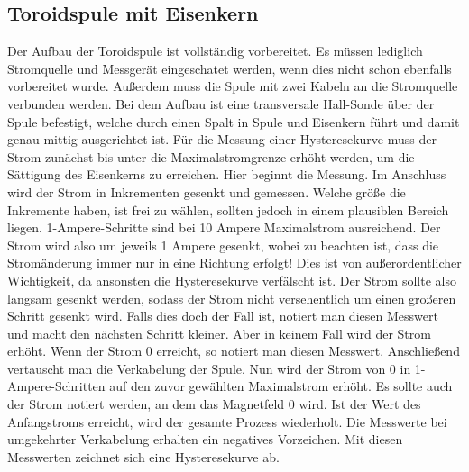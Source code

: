 \subsection{Toroidspule mit Eisenkern}
Der Aufbau der Toroidspule ist vollständig vorbereitet. Es müssen lediglich Stromquelle und Messgerät eingeschatet werden, wenn dies nicht schon ebenfalls vorbereitet wurde.
Außerdem muss die Spule mit zwei Kabeln an die Stromquelle verbunden werden.
Bei dem Aufbau ist eine transversale Hall-Sonde über der Spule befestigt, welche durch einen Spalt in Spule und Eisenkern führt und damit genau mittig ausgerichtet ist.
Für die Messung einer Hysteresekurve muss der Strom zunächst bis unter die Maximalstromgrenze erhöht werden, um die Sättigung des Eisenkerns zu erreichen.
Hier beginnt die Messung. Im Anschluss wird der Strom in Inkrementen gesenkt und gemessen. Welche größe die Inkremente haben, ist frei zu wählen, sollten jedoch in einem
plausiblen Bereich liegen. 1-Ampere-Schritte sind bei 10 Ampere Maximalstrom ausreichend. Der Strom wird also um jeweils 1 Ampere gesenkt, wobei zu beachten ist, dass die Stromänderung immer
nur in eine Richtung erfolgt! Dies ist von außerordentlicher Wichtigkeit, da ansonsten die Hysteresekurve verfälscht ist. Der Strom sollte also langsam gesenkt werden, sodass der Strom nicht
versehentlich um einen großeren Schritt gesenkt wird. Falls dies doch der Fall ist, notiert man diesen Messwert und macht den nächsten Schritt kleiner. Aber in keinem Fall wird der Strom erhöht.
Wenn der Strom 0 erreicht, so notiert man diesen Messwert. Anschließend vertauscht man die Verkabelung der Spule. Nun wird der Strom von 0 in 1-Ampere-Schritten auf den zuvor gewählten Maximalstrom erhöht.
Es sollte auch der Strom notiert werden, an dem das Magnetfeld 0 wird. Ist der Wert des Anfangstroms erreicht, wird der gesamte Prozess wiederholt.
Die Messwerte bei umgekehrter Verkabelung erhalten ein negatives Vorzeichen. Mit diesen Messwerten zeichnet sich eine Hysteresekurve ab.
